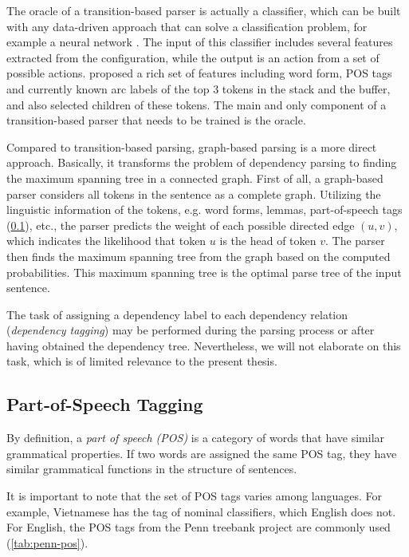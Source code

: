The oracle of a transition-based parser is actually a classifier, which can be built with any data-driven approach that can solve a classification problem, for example a neural network \citep{chen2014fast}.
The input of this classifier includes several features extracted from the configuration, while the output is an action from a set of possible actions.
\citeauthor{chen2014fast} proposed a rich set of features including word form, POS tags and currently known arc labels of the top 3 tokens in the stack and the buffer, and also selected children of these tokens.
The main and only component of a transition-based parser that needs to be trained is the oracle.

Compared to transition-based parsing, graph-based parsing is a more direct approach.
Basically, it transforms the problem of dependency parsing to finding the maximum spanning tree in a connected graph.
First of all, a graph-based parser considers all tokens in the sentence as a complete graph.
Utilizing the linguistic information of the tokens, e.g. word forms, lemmas, part-of-speech tags (\cref{the-ling-pos}), etc., the parser predicts the weight of each possible directed edge $(u,v)$, which indicates the likelihood that token $u$ is the head of token $v$.
The parser then finds the maximum spanning tree from the graph based on the computed probabilities.
This maximum spanning tree is the optimal parse tree of the input sentence.

The task of assigning a dependency label to each dependency relation (\textit{dependency tagging}) may be performed during the parsing process or after having obtained the dependency tree. Nevertheless, we will not elaborate on this task, which is of limited relevance to the present thesis.

\subsection{Part-of-Speech Tagging}
\label{the-ling-pos}

By definition, a \textit{part of speech (POS)} is a category of words that have similar grammatical properties.
If two words are assigned the same POS tag, they have similar grammatical functions in the structure of sentences.

It is important to note that the set of POS tags varies among languages. For example, Vietnamese has the tag of nominal classifiers, which English does not. For English, the POS tags from the Penn treebank project \citep{Marcus93buildinga} are commonly used (\cref{tab:penn-pos}).

